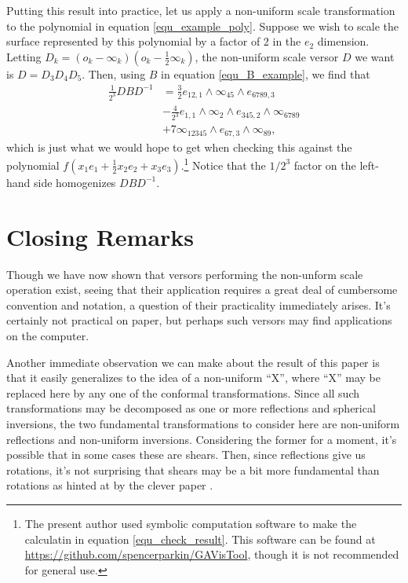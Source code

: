 \documentclass{birkjour}
\theoremstyle{definition}
\theoremstyle{remark}
\numberwithin{equation}{section}
\newcommand{\nvai}{\infty}
\newcommand{\nvao}{o}
\begin{document}
Putting this result into practice, let us apply a non-uniform scale transformation
to the polynomial in equation \eqref{equ_example_poly}.  Suppose we wish
to scale the surface represented by this polynomial by a factor of 2 in the $e_2$ dimension.
Letting $D_k=(\nvao_k-\nvai_k)\left(\nvao_k-\frac{1}{2}\nvai_k\right)$, the non-uniform
scale versor $D$ we
want is $D=D_3D_4D_5$.  Then, using $B$ in equation \eqref{equ_B_example}, we find that
\begin{align}
\frac{1}{2^3}DBD^{-1} &= \frac{3}{2}e_{12,1}\wedge \nvai_{45}\wedge e_{6789,3}\nonumber \\
 &-\frac{4}{2^3}e_{1,1}\wedge\nvai_2\wedge e_{345,2}\wedge\nvai_{6789}\nonumber \\
 &+7\nvai_{12345}\wedge e_{67,3}\wedge \nvai_{89},\label{equ_check_result}
\end{align}
which is just what we would hope to get when checking this against the
polynomial $f\left(x_1e_1+\frac{1}{2}x_2e_2+x_3e_3\right)$.\footnote{The present author
used symbolic computation software to make the calculatin in equation \eqref{equ_check_result}.
This software can be found at \url{https://github.com/spencerparkin/GAVisTool}, though it
is not recommended for general use.}  Notice that the $1/2^3$ factor on the left-hand
side homogenizes $DBD^{-1}$.

\section{Closing Remarks}

Though we have now shown that versors performing the non-unform scale operation
exist, seeing that their application requires a great deal of cumbersome convention and notation,
a question of their practicality immediately arises.  It's certainly not practical on paper, but
perhaps such versors may find applications on the computer.

Another immediate observation we can make about the result of this paper is that it
easily generalizes to the idea of a non-uniform ``X'', where ``X'' may be replaced here
by any one of the conformal transformations.  Since all such transformations may be
decomposed as one or more reflections and spherical inversions, the two fundamental
transformations to consider here are non-uniform reflections and non-uniform inversions.
Considering the former for a moment, it's possible that in some cases these are shears.
Then, since reflections give us rotations, it's not surprising that shears may be a bit
more fundamental than rotations as hinted at by the clever paper \cite{Paeth90}.
\end{document}
